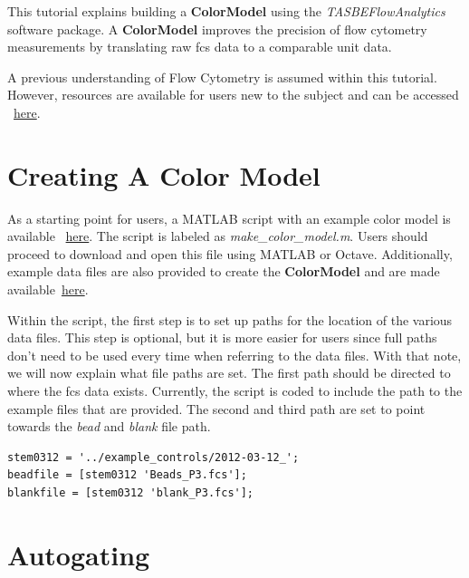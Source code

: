 
This tutorial explains building a \textbf{ColorModel} using the \textit{TASBEFlowAnalytics} software package. A \textbf{ColorModel} improves the precision of flow cytometry measurements by translating raw fcs data to a comparable unit data. 

A previous understanding of Flow Cytometry is assumed within this tutorial. However, resources are available for users new to the subject and can be accessed ~\href{https://github.com/mehersam/TASBEFlowAnalytics/tree/gh-pages/docs/FlowCytometryDocumentation}{here}. 

\section*{Creating A Color Model}

  As a starting point for users, a MATLAB script with an example color model is available ~\href{https://github.com/mehersam/TASBEFlowAnalytics/blob/gh-pages/docs/ColorModelTutorial/make\_color\_model.m}{here}. The script is labeled as \textit{make\_color\_model.m}. Users should proceed to download and open this file using MATLAB or Octave. Additionally, example data files are also provided to create the \textbf{ColorModel} and are made available~\href{https://github.com/mehersam/TASBEFlowAnalytics/tree/gh-pages/docs/Example Files/}{here}.  

Within the script, the first step is to set up paths for the location of the various data files. This step is optional, but it is more easier for users since full paths don't need to be used every time when referring to the data files. With that note, we will now explain what file paths are set. The first path should be directed to where the fcs data exists. Currently, the script is coded to include the path to the example files that are provided. The second and third path are set to point towards the \textit{bead} and \textit{blank} file path. 

  
\begin{minipage}{0.95\textwidth} 
\begin{lstlisting}
stem0312 = '../example_controls/2012-03-12_';
beadfile = [stem0312 'Beads_P3.fcs'];
blankfile = [stem0312 'blank_P3.fcs'];
\end{lstlisting}
\end{minipage}
 
\section*{Autogating}

